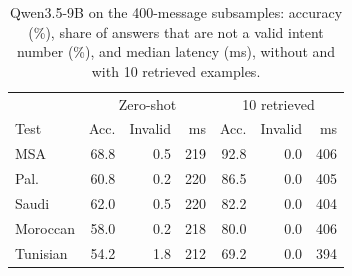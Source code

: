 \begin{table}[t]\centering\small\caption{Qwen3.5-9B on the 400-message subsamples: accuracy (\%), share of answers that are not a valid intent number (\%), and median latency (ms), without and with 10 retrieved examples.}\label{tab:llm}
\begin{tabular}{lrrrrrr}\toprule
& \multicolumn{3}{c}{Zero-shot} & \multicolumn{3}{c}{10 retrieved}\\
Test & Acc. & Invalid & ms & Acc. & Invalid & ms \\\midrule
MSA & 68.8 & 0.5 & 219 & 92.8 & 0.0 & 406 \\
Pal. & 60.8 & 0.2 & 220 & 86.5 & 0.0 & 405 \\
Saudi & 62.0 & 0.5 & 220 & 82.2 & 0.0 & 404 \\
Moroccan & 58.0 & 0.2 & 218 & 80.0 & 0.0 & 406 \\
Tunisian & 54.2 & 1.8 & 212 & 69.2 & 0.0 & 394 \\
\bottomrule\end{tabular}\end{table}
